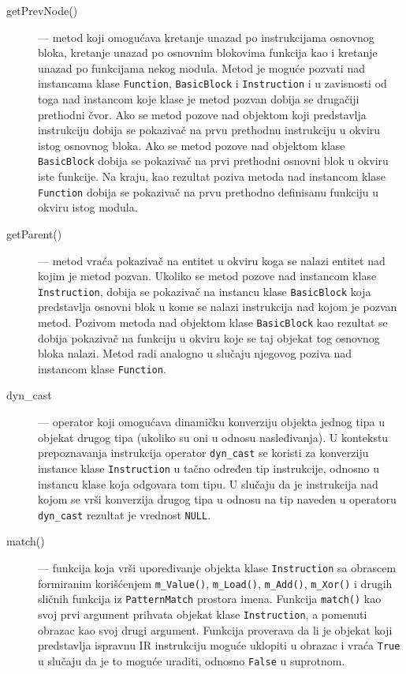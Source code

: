 \documentclass[12pt,oneside]{memoir}
\begin{document}
\begin{description}
  \item[getPrevNode()] --- metod koji omogućava kretanje unazad po instrukcijama osnovnog bloka, kretanje unazad po osnovnim blokovima funkcija kao i kretanje unazad po funkcijama nekog modula. Metod je moguće pozvati nad instancama klase \texttt{Function}, \texttt{BasicBlock} i \texttt{Instruction} i u zavisnosti od toga nad instancom koje klase je metod pozvan dobija se drugačiji prethodni čvor. Ako se metod pozove nad objektom koji predstavlja instrukciju dobija se pokazivač na prvu prethodnu instrukciju u okviru istog osnovnog bloka. Ako se metod pozove nad objektom klase \texttt{BasicBlock} dobija se pokazivač na prvi prethodni osnovni blok u okviru iste funkcije. Na kraju, kao rezultat poziva metoda nad instancom klase \texttt{Function} dobija se pokazivač na prvu prethodno definisanu funkciju u okviru istog modula. 
  
  \item[getParent()] --- metod vraća pokazivač na entitet u okviru koga se nalazi entitet nad kojim je metod pozvan. Ukoliko se metod pozove nad instancom klase 
  \texttt{Instruction}, dobija se pokazivač na instancu klase \texttt{BasicBlock} koja predstavlja osnovni blok u kome se nalazi instrukcija nad kojom je pozvan metod. Pozivom metoda nad objektom klase \texttt{BasicBlock} kao rezultat se dobija pokazivač na funkciju u okviru koje se taj objekat tog osnovnog bloka nalazi. Metod radi analogno u slučaju njegovog poziva nad instancom klase \texttt{Function}.
  
  \item[dyn\_cast] --- operator koji omogućava dinamičku konverziju objekta jednog tipa u objekat drugog tipa (ukoliko su oni u odnosu nasleđivanja). U kontekstu prepoznavanja instrukcija operator \texttt{dyn\_cast}
  se koristi za konverziju instance klase \texttt{Instruction} u tačno određen tip instrukcije, odnosno u instancu klase koja odgovara tom tipu. U slučaju da je instrukcija nad kojom se vrši konverzija drugog tipa u odnosu na tip naveden u operatoru \texttt{dyn\_cast} rezultat je vrednost \texttt{NULL}. 
  
  \item[match()] --- funkcija koja vrši upoređivanje objekta klase \texttt{Instruction} sa obrascem formiranim korišćenjem \texttt{m\_Value()}, \texttt{m\_Load()}, \texttt{m\_Add()}, \texttt{m\_Xor()} i drugih sličnih funkcija iz \texttt{PatternMatch} prostora imena. Funkcija \texttt{match()} kao svoj prvi argument prihvata objekat klase \texttt{Instruction}, a pomenuti obrazac kao svoj drugi argument. Funkcija proverava da li je objekat koji predstavlja ispravnu IR instrukciju moguće uklopiti u obrazac i vraća \texttt{True} u slučaju da je to moguće uraditi, odnosno \texttt{False} u suprotnom.
  

\end{description}
\end{document}
